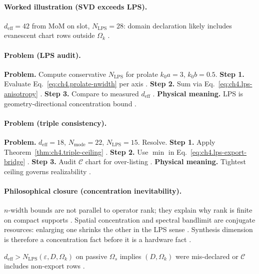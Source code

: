 \paragraph{Worked illustration (SVD exceeds LPS).}
\(d_{\mathrm{eff}}=42\) from MoM on slot, \(N_{\mathrm{LPS}}=28\): domain declaration likely includes evanescent chart rows outside \(\Omega_{k}\)
\cite{harrington2001,devaney2004,hansen1988}.

\paragraph{Problem (LPS audit).}
\textbf{Problem.} Compute conservative \(N_{\mathrm{LPS}}\) for prolate \(k_{0}a=3\), \(k_{0}b=0.5\).
\textbf{Step 1.} Evaluate Eq.~\eqref{eq:ch4.prolate-nwidth} per axis \cite{hansen1988,jackson1999}.
\textbf{Step 2.} Sum via Eq.~\eqref{eq:ch4.lps-anisotropy} \cite{stratton1941}.
\textbf{Step 3.} Compare to measured \(d_{\mathrm{eff}}\) \cite{harrington2001,devaney2004}.
\textbf{Physical meaning.} LPS is geometry-directional concentration bound \cite{hansen1988}.

\paragraph{Problem (triple consistency).}
\textbf{Problem.} \(d_{\mathrm{eff}}=18\), \(N_{\mathrm{mode}}=22\), \(N_{\mathrm{LPS}}=15\). Resolve.
\textbf{Step 1.} Apply Theorem~\ref{thm:ch4.triple-ceiling} \cite{hansen1988,stratton1941}.
\textbf{Step 2.} Use \(\min\) in Eq.~\eqref{eq:ch4.lps-export-bridge} \cite{harrington2001}.
\textbf{Step 3.} Audit \(\mathcal{C}\) chart for over-listing \cite{devaney2004}.
\textbf{Physical meaning.} Tightest ceiling governs realizability \cite{stratton1941}.

\paragraph{Philosophical closure (concentration inevitability).}
\(n\)-width bounds are not parallel to operator rank; they explain why rank is finite on compact supports \cite{hansen1988,stratton1941,harrington2001}.
Spatial concentration and spectral bandlimit are conjugate resources: enlarging one shrinks the other in the LPS sense \cite{jackson1999,devaney2004}.
Synthesis dimension is therefore a concentration fact before it is a hardware fact \cite{harrington2001}.

\begin{corollary}
\label{cor:ch4.lps-domain}
\(d_{\mathrm{eff}}>N_{\mathrm{LPS}}(\varepsilon,D,\Omega_{k})\) on passive \(\Omega_{s}\) implies \((D,\Omega_{k})\) were mis-declared or
\(\mathcal{C}\) includes non-export rows \cite{hansen1988,harrington2001,devaney2004,stratton1941}.
\end{corollary}
